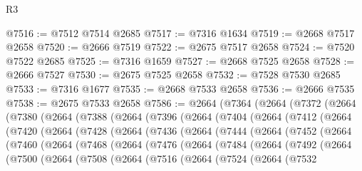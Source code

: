 \begin{lexlean}{R3}
\begin{coremodule}
@7516 := @7512 @7514 @2685
@7517 := @7316 @1634
@7519 := @2668 @7517 @2658
@7520 := @2666 @7519
@7522 := @2675 @7517 @2658
@7524 := @7520 @7522 @2685
@7525 := @7316 @1659
@7527 := @2668 @7525 @2658
@7528 := @2666 @7527
@7530 := @2675 @7525 @2658
@7532 := @7528 @7530 @2685
@7533 := @7316 @1677
@7535 := @2668 @7533 @2658
@7536 := @2666 @7535
@7538 := @2675 @7533 @2658
@7586 := @2664
    (@7364
      (@2664
        (@7372
          (@2664
            (@7380
              (@2664
                (@7388
                  (@2664
                    (@7396
                      (@2664
                        (@7404
                          (@2664
                            (@7412
                              (@2664
                                (@7420
                                  (@2664
                                    (@7428
                                      (@2664
                                        (@7436
                                          (@2664
                                            (@7444
                                              (@2664
                                                (@7452
                                                  (@2664
                                                    (@7460
                                                      (@2664
                                                        (@7468
                                                          (@2664
                                                            (@7476
                                                              (@2664
                                                                (@7484
                                                                  (@2664
                                                                    (@7492
                                                                      (@2664
                                                                        (@7500
                                                                          (@2664
                                                                            (@7508
                                                                              (@2664
                                                                                (@7516
                                                                                  (@2664
                                                                                    (@7524
                                                                                      (@2664
                                                                                        (@7532

\end{coremodule}
\end{lexlean}
